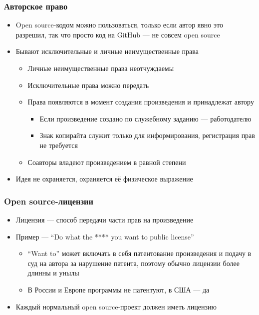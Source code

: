 \documentclass[xetex,mathserif,serif]{beamer}
\begin{document}
	\begin{frame}
		\frametitle{Авторское право}
		\begin{itemize}
			\item Open source-кодом можно пользоваться, только если автор явно это разрешил, так что просто код на GitHub --- не совсем open source
			\item Бывают исключительные и личные неимущественные права
			\begin{itemize}
				\item Личные неимущественные права неотчуждаемы
				\item Исключительные права можно передать
				\item Права появляются в момент создания произведения и принадлежат автору
				\begin{itemize}
					\item Если произведение создано по служебному заданию --- работодателю
					\item Знак копирайта служит только для информирования, регистрация прав не требуется
				\end{itemize}
				\item Соавторы владеют произведением в равной степени
			\end{itemize}
			\item Идея не охраняется, охраняется её физическое выражение
		\end{itemize}
	\end{frame}

	\begin{frame}
		\frametitle{Open source-лицензии}
		\begin{itemize}
			\item Лицензия --- способ передачи части прав на произведение
			\item Пример --- ``Do what the **** you want to public license''
			\begin{itemize}
				\item ``Want to'' может включать в себя патентование произведения и подачу в суд на автора за нарушение патента, поэтому обычно лицензии более длинны и унылы
				\item В России и Европе программы не патентуют, в США --- да
			\end{itemize}
			\item Каждый нормальный open source-проект должен иметь лицензию
		\end{itemize}
	\end{frame}
\end{document}
